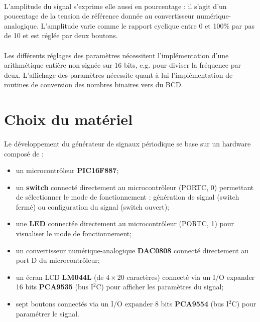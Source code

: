 \documentclass{article}
\begin{document}
    \paragraph{}
    L'amplitude du signal s'exprime elle aussi en pourcentage : il s'agit d'un poucentage de la tension de référence donnée au convertisseur numérique-analogique. L'amplitude varie comme le rapport cyclique entre 0 et 100\% par pas de 10 et est réglée par deux boutons.

    \paragraph{}
    Les différents réglages des paramètres nécessitent l'implémentation d'une arithmétique entière non signée sur 16 bits, e.g. pour diviser la fréquence par deux. L'affichage des paramètres nécessite quant à lui l'implémentation de routines de conversion des nombres binaires vers du BCD.


    \section{Choix du matériel}
    \paragraph{}
    Le développement du générateur de signaux périodique se base sur un hardware composé de :
    \begin{itemize}[label=$\bullet$]
        \item un microcontrôleur \textbf{PIC16F887};
        \item un \textbf{switch} connecté directement au microcontrôleur (PORTC, 0) permettant de sélectionner le mode de fonctionnement : génération de signal (switch fermé) ou configuration du signal (switch ouvert);
        \item une \textbf{LED} connectée directement au microcontrôleur (PORTC, 1) pour visualiser le mode de fonctionnement;
        \item un convertisseur numérique-analogique \textbf{DAC0808} connecté directement au port D du microcontrôleur;
        \item un écran LCD \textbf{LM044L} (de $4\times 20$ caractères) connecté via un I/O expander 16 bits \textbf{PCA9535} (bus I$^2$C) pour afficher les paramètres du signal;
        \item sept boutons connectés via un I/O expander 8 bits \textbf{PCA9554} (bus I$^2$C) pour paramétrer le signal.
    \end{itemize}
\end{document}
